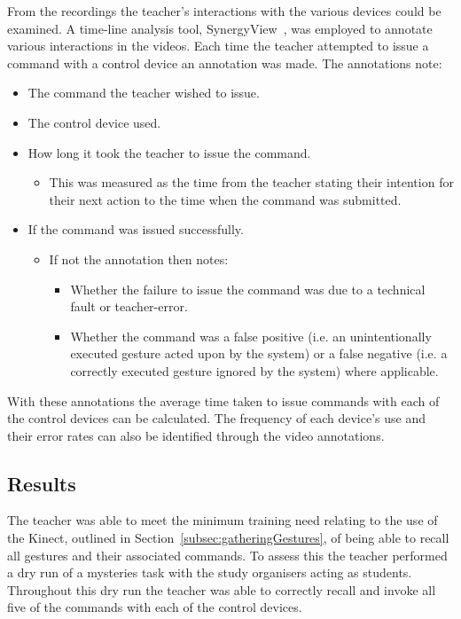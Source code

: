 \documentclass[link]{IWCOMP}
\begin{document}
From the recordings the teacher's interactions with the various devices could be examined.
A time-line analysis tool, SynergyView~\cite{Kyaw2011}, was employed to annotate various interactions in the videos.
Each time the teacher attempted to issue a command with a control device an annotation was made.
The annotations note:
\begin{itemize}
\item The command the teacher wished to issue.
\item The control device used.
\item How long it took the teacher to issue the command.
\begin{itemize}
\item This was measured as the time from the teacher stating their intention for their next action to the time when the command was submitted.
\end{itemize}
\item If the command was issued successfully.
\begin{itemize}
\item If not the annotation then notes:
\begin{itemize}
\item Whether the failure to issue the command was due to a technical fault or teacher-error.
\item Whether the command was a false positive (i.e. an unintentionally executed gesture acted upon by the system) or a false negative (i.e. a correctly executed gesture ignored by the system) where applicable.\\
\end{itemize}
\end{itemize}
\end{itemize}
With these annotations the average time taken to issue commands with each of the control devices can be calculated.
The frequency of each device's use and their error rates can also be identified through the video annotations.

\subsection{Results}
\label{subsec:studyPhase1Results}


The teacher was able to meet the minimum training need relating to the use of the Kinect, outlined in Section~\ref{subsec:gatheringGestures}, of being able to recall all gestures and their associated commands.
To assess this the teacher performed a dry run of a mysteries task with the study organisers acting as students.
Throughout this dry run the teacher was able to correctly recall and invoke all five of the commands with each of the control devices.
\end{document}
